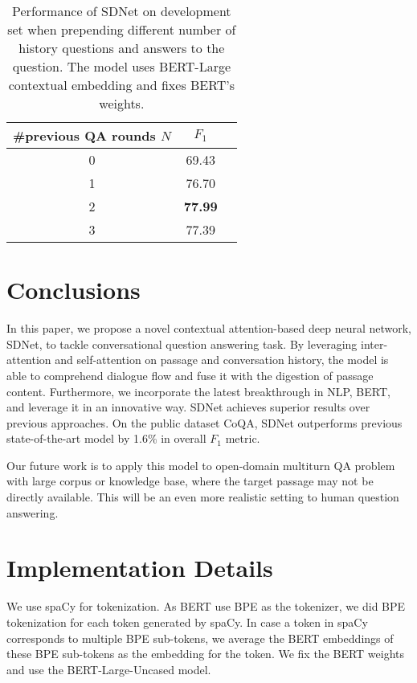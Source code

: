 \documentclass{article} \usepackage{sdnet,times}
\begin{document}
\begin{table}[h]
\centering
\caption{Performance of SDNet on development set when prepending different number of history questions and answers to the question. The model uses BERT-Large contextual embedding and fixes BERT's weights.}
\label{table:context}
\begin{tabular}{ccc}
\toprule
\#previous QA rounds $N$ & $F_1$ \\ \midrule
0 & 69.43 \\
1 & 76.70\\
2 & \textbf{77.99}\\
3 & 77.39\\
\bottomrule
\end{tabular}
\end{table}

\section{Conclusions}
\label{conclusion}
In this paper, we propose a novel contextual attention-based deep neural network, SDNet, to tackle conversational question answering task. By leveraging inter-attention and self-attention on passage and conversation history, the model is able to comprehend dialogue flow and fuse it with the digestion of passage content. Furthermore, we incorporate the latest breakthrough in NLP, BERT, and leverage it in an innovative way. SDNet achieves superior results over previous approaches. On the public dataset CoQA, SDNet outperforms previous state-of-the-art model by 1.6\% in overall $F_1$ metric.

Our future work is to apply this model to open-domain multiturn QA problem with large corpus or knowledge base, where the target passage may not be directly available. This will be an even more realistic setting to human question answering.




\appendix \label{sec:appendix}
\section{Implementation Details}
We use spaCy for tokenization. As BERT use BPE as the tokenizer, we did BPE tokenization for each token generated by spaCy. In case a token in spaCy corresponds to multiple BPE sub-tokens, we average the BERT embeddings of these BPE sub-tokens as the embedding for the token. We fix the BERT weights and use the BERT-Large-Uncased model.
\end{document}
